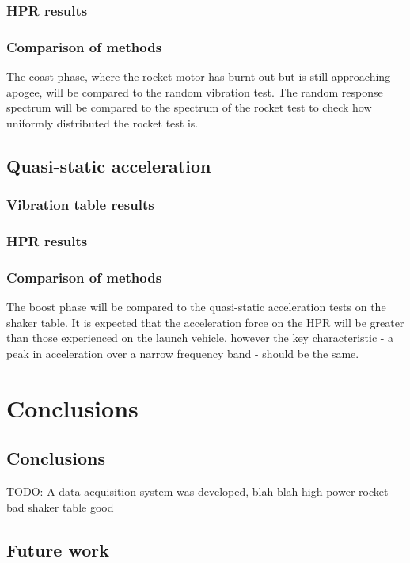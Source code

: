 \documentclass{report}
\begin{document}
\subsection{HPR results}
\subsection{Comparison of methods}
The coast phase, where the rocket motor has burnt out but is still approaching apogee, will be compared to the random vibration test. The random response spectrum will be compared to the spectrum of the rocket test to check how uniformly distributed the rocket test is.

\section{Quasi-static acceleration}
\subsection{Vibration table results}
\subsection{HPR results}
\subsection{Comparison of methods}
The boost phase will be compared to the quasi-static acceleration tests on the shaker table. It is expected that the acceleration force on the HPR will be greater than those experienced on the launch vehicle, however the key characteristic - a peak in acceleration over a narrow frequency band - should be the same.

\chapter{Conclusions}

\section{Conclusions}

TODO: A data acquisition system was developed, blah blah high power rocket bad shaker table good

\section{Future work}
\end{document}
